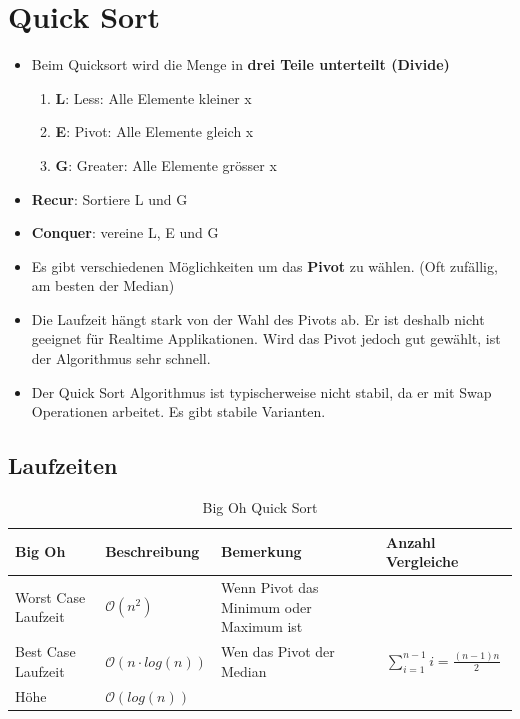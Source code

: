  \section{Quick Sort}
\begin{itemize}
	\item Beim Quicksort wird die Menge in \textbf{drei Teile unterteilt (Divide)} 
	\begin{enumerate}
		\item \textbf{L}: Less: Alle Elemente kleiner x
		\item \textbf{E}: Pivot: Alle Elemente gleich x
		\item \textbf{G}: Greater: Alle Elemente grösser x
	\end{enumerate}
	\item \textbf{Recur}: Sortiere L und G
	\item \textbf{Conquer}: vereine L, E und G
	\item Es gibt verschiedenen Möglichkeiten um das \textbf{Pivot} zu wählen. (Oft zufällig, am besten der Median)
	\item Die Laufzeit hängt stark von der Wahl des Pivots ab. Er ist deshalb nicht geeignet für Realtime Applikationen. Wird das Pivot jedoch gut gewählt, ist der Algorithmus sehr schnell.
	\item Der Quick Sort Algorithmus ist typischerweise nicht stabil, da er mit Swap Operationen arbeitet. Es gibt stabile Varianten.
\end{itemize}

\subsection{Laufzeiten}
\begin{table}[h]
	\centering
	\begin{tabu} to \linewidth {l l X X}
		\toprule
		Big Oh & Beschreibung & Bemerkung & Anzahl Vergleiche \\
		\midrule
		Worst Case Laufzeit & $\mathcal{O}(n^2)$ & Wenn Pivot das Minimum oder Maximum ist & \\
		Best Case Laufzeit &  $\mathcal{O}(n \cdot log(n))$ & Wen das Pivot der Median & $\sum_{i=1}^{n-1} i = \frac{(n-1)n}{2}$\\
		Höhe & $\mathcal{O}(log(n))$ & \\
		\bottomrule
	\end{tabu}
	\caption{Big Oh Quick Sort}
\end{table}


